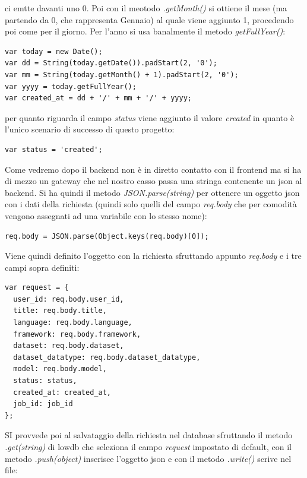 \documentclass[a4paper,12pt, oneside]{book}
\begin{document}
ci emtte davanti uno 0. Poi con il meotodo \textit{.getMonth()} si ottiene il mese
(ma partendo da 0, che rappresenta Gennaio) al quale viene aggiunto 1, procedendo
poi come per il giorno. Per l'anno si usa banalmente il metodo \textit{getFullYear()}:
\begin{shaded} 
\begin{verbatim}
var today = new Date();
var dd = String(today.getDate()).padStart(2, '0');
var mm = String(today.getMonth() + 1).padStart(2, '0');
var yyyy = today.getFullYear();
var created_at = dd + '/' + mm + '/' + yyyy;
\end{verbatim}
\end{shaded}
per quanto riguarda il campo \textit{status} viene aggiunto il valore \textit{created} in quanto è l'unico scenario di successo di questo progetto:
\begin{shaded} 
\begin{verbatim}
var status = 'created';
\end{verbatim}
\end{shaded}
Come vedremo dopo il backend non è in diretto contatto con il frontend
ma si ha di mezzo un gateway che nel nostro casso passa una stringa contenente un json al backend.
Si ha quindi il metodo \textit{JSON.parse(string)} per ottenere un oggetto json con i dati della richiesta (quindi solo quelli del campo \textit{req.body} che per comodità vengono assegnati ad una variabile con lo stesso nome):
\begin{shaded} 
\begin{verbatim}
req.body = JSON.parse(Object.keys(req.body)[0]);  
\end{verbatim}
\end{shaded}
Viene quindi definito l'oggetto con la richiesta sfruttando appunto \textit{req.body} e i tre campi sopra definiti:
\begin{shaded} 
\begin{verbatim}
var request = {
  user_id: req.body.user_id,
  title: req.body.title,
  language: req.body.language,
  framework: req.body.framework,
  dataset: req.body.dataset,
  dataset_datatype: req.body.dataset_datatype,
  model: req.body.model,  
  status: status,
  created_at: created_at,
  job_id: job_id
};
\end{verbatim}
\end{shaded}
SI provvede poi al salvataggio della richiesta nel database sfruttando il metodo \textit{.get(string)} di lowdb che seleziona il campo \textit{request} impostato di default, con il metodo \textit{.push(object)} inserisce l'oggetto json e con il metodo \textit{.write()} scrive nel file:
\end{document}
